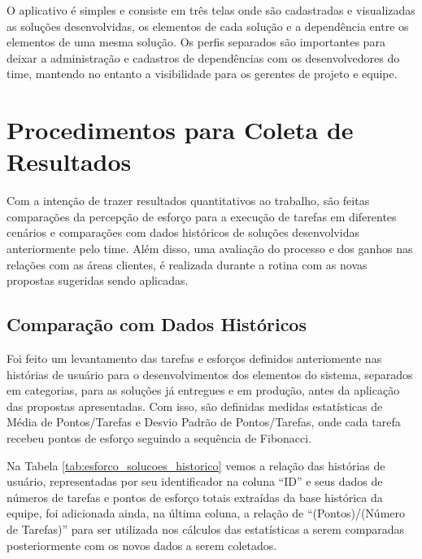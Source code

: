 	O aplicativo é simples e consiste em três telas onde são cadastradas e visualizadas as soluções desenvolvidas, os elementos de cada solução e a dependência entre os elementos de uma mesma solução.
	Os perfis separados são importantes para deixar a administração e cadastros de dependências com os desenvolvedores do time, mantendo no entanto a visibilidade para os gerentes de projeto e equipe.
	
	\section{Procedimentos para Coleta de Resultados}

	Com a intenção de trazer resultados quantitativos ao trabalho, são feitas comparações da percepção de esforço para a execução de tarefas em diferentes cenários e
	comparações com dados históricos de soluções desenvolvidas anteriormente pelo time. Além disso, uma avaliação do processo e dos ganhos nas relações com as áreas clientes, é realizada durante a rotina com as novas propostas sugeridas sendo aplicadas.

	\subsection{Comparação com Dados Históricos}

	Foi feito um levantamento das tarefas e esforços definidos anteriomente nas histórias de usuário para o desenvolvimentos dos elementos do sistema, separados em categorias,
	para as soluções já entregues e em produção, antes da aplicação das propostas apresentadas. Com isso, são definidas medidas estatísticas de Média de Pontos/Tarefas e Desvio Padrão de Pontos/Tarefas,
	onde cada tarefa recebeu pontos de esforço seguindo a sequência de Fibonacci.
	
	Na Tabela \ref{tab:esforco_solucoes_historico} vemos a relação das histórias de usuário, representadas por seu identificador na coluna ``ID'' e seus dados de números de
	tarefas e pontos de esforço totais extraídas da	base histórica da equipe, foi adicionada ainda, na última coluna, a relação de ``(Pontos)/(Número de Tarefas)'' para ser
	utilizada nos cálculos das estatísticas a serem comparadas posteriormente com os novos dados a serem coletados.

